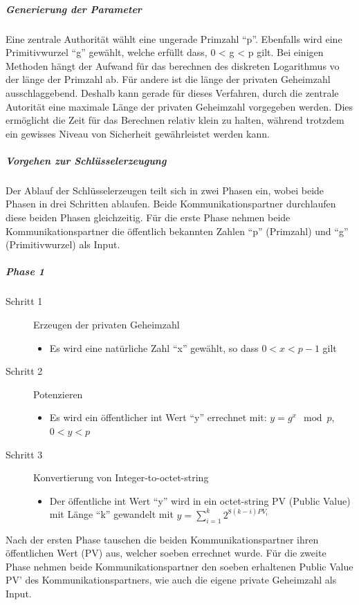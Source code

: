 \documentclass[10pt,a4paper]{article}
\begin{document}
\subparagraph{Generierung der Parameter}
Eine zentrale Authorität wählt eine ungerade Primzahl "`p"'. Ebenfalls wird eine
Primitivwurzel "`g"' gewählt, welche erfüllt dass, 0 < g < p gilt. Bei einigen Methoden
hängt der Aufwand für das berechnen des diskreten Logarithmus vo der länge der Primzahl
ab. Für andere ist die länge der privaten Geheimzahl ausschlaggebend. Deshalb kann gerade
für dieses Verfahren, durch die zentrale Autorität eine maximale Länge der privaten
Geheimzahl vorgegeben werden. Dies ermöglicht die Zeit für das Berechnen relativ klein zu
halten, während trotzdem ein gewisses Niveau von Sicherheit gewährleistet werden kann.

\subparagraph{Vorgehen zur Schlüsselerzeugung}
Der Ablauf der Schlüsselerzeugen teilt sich in zwei Phasen ein, wobei beide Phasen in drei
Schritten ablaufen. Beide Kommunikationspartner durchlaufen diese beiden Phasen gleichzeitig.
Für die erste Phase nehmen beide Kommunikationspartner die öffentlich bekannten Zahlen
"`p"' (Primzahl) und "`g"' (Primitivwurzel) als Input.

\subparagraph{Phase 1}
\begin{description}
    \item[Schritt 1] Erzeugen der privaten Geheimzahl
        \begin{itemize}
            \item Es wird eine natürliche Zahl "`x"' gewählt, so dass $0 < x < p - 1$ gilt
        \end{itemize}
    \item[Schritt 2] Potenzieren
        \begin{itemize}
            \item Es wird ein öffentlicher int Wert "`y"' errechnet mit: $y = g^x \mod
                p$, $0 < y < p$
        \end{itemize}
    \item[Schritt 3] Konvertierung von Integer-to-octet-string
        \begin{itemize}
            \item Der öffentliche int Wert "`y"' wird in ein octet-string PV (Public
                Value) mit Länge "`k"' gewandelt mit $y = \sum_{i=1}^k 2^{8(k-i) PV_i}$
        \end{itemize}
\end{description}

Nach der ersten Phase tauschen die beiden Kommunikationspartner ihren öffentlichen Wert
(PV) aus, welcher soeben errechnet wurde. Für die zweite Phase nehmen beide
Kommunikationspartner den soeben erhaltenen Public Value PV' des Kommunikationspartners,
wie auch die eigene private Geheimzahl als Input.
\end{document}
